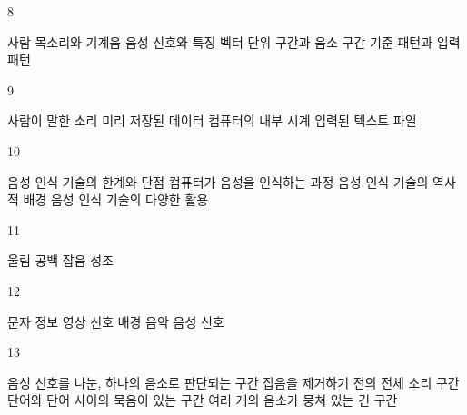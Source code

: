 \documentclass[fs9,seriesRus]{korfarm-base}
\begin{document}
\begin{kfSentenceUnit}{8}{}
\begin{kfChoices}
\kfChoice 사람 목소리와 기계음
\kfChoice 음성 신호와 특징 벡터
\kfChoice 단위 구간과 음소 구간
\kfChoice 기준 패턴과 입력 패턴
\end{kfChoices}
\end{kfSentenceUnit}

\begin{kfSentenceUnit}{9}{}
\begin{kfChoices}
\kfChoice 사람이 말한 소리
\kfChoice 미리 저장된 데이터
\kfChoice 컴퓨터의 내부 시계
\kfChoice 입력된 텍스트 파일
\end{kfChoices}
\end{kfSentenceUnit}

\begin{kfSentenceUnit}{10}{}
\begin{kfChoices}
\kfChoice 음성 인식 기술의 한계와 단점
\kfChoice 컴퓨터가 음성을 인식하는 과정
\kfChoice 음성 인식 기술의 역사적 배경
\kfChoice 음성 인식 기술의 다양한 활용
\end{kfChoices}
\end{kfSentenceUnit}

\begin{kfSentenceUnit}{11}{}
\begin{kfChoices}
\kfChoice 울림
\kfChoice 공백
\kfChoice 잡음
\kfChoice 성조
\end{kfChoices}
\end{kfSentenceUnit}

\begin{kfSentenceUnit}{12}{}
\begin{kfChoices}
\kfChoice 문자 정보
\kfChoice 영상 신호
\kfChoice 배경 음악
\kfChoice 음성 신호
\end{kfChoices}
\end{kfSentenceUnit}

\begin{kfSentenceUnit}{13}{}
\begin{kfChoices}
\kfChoice 음성 신호를 나눈, 하나의 음소로 판단되는 구간
\kfChoice 잡음을 제거하기 전의 전체 소리 구간
\kfChoice 단어와 단어 사이의 묵음이 있는 구간
\kfChoice 여러 개의 음소가 뭉쳐 있는 긴 구간
\end{kfChoices}
\end{kfSentenceUnit}
\end{document}
